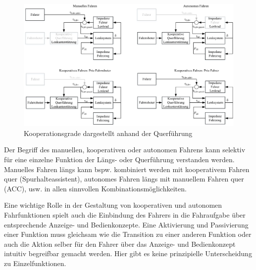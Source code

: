 \begin{figure}[htp!]
  \centering
    \includegraphics[width=12cm]{Bilder/01/kooperationsgrade.eps}
    \caption{Kooperationsgrade dargestellt anhand der Querführung}
    \label{fig:koopgrad}
\end{figure}
Der Begriff des manuellen, kooperativen oder autonomen Fahrens kann selektiv für eine einzelne Funktion der Längs- oder Querführung verstanden werden. 
Manuelles Fahren längs kann bspw. kombiniert werden mit kooperativem Fahren quer (Spurhalteassistent), autonomes Fahren längs mit manuellem Fahren quer (ACC), usw. in allen sinnvollen Kombinationsmöglichkeiten.

Eine wichtige Rolle in der Gestaltung von kooperativen und autonomen Fahrfunktionen spielt auch die Einbindung des Fahrers in die Fahraufgabe über entsprechende Anzeige- und Bedienkonzepte. Eine Aktivierung und Passivierung einer Funktion muss gleichsam wie die Transition zu einer anderen Funktion oder auch die Aktion selber für den Fahrer über das Anzeige- und Bedienkonzept intuitiv begreifbar gemacht werden.
Hier gibt es keine prinzipielle Unterscheidung zu Einzelfunktionen.





